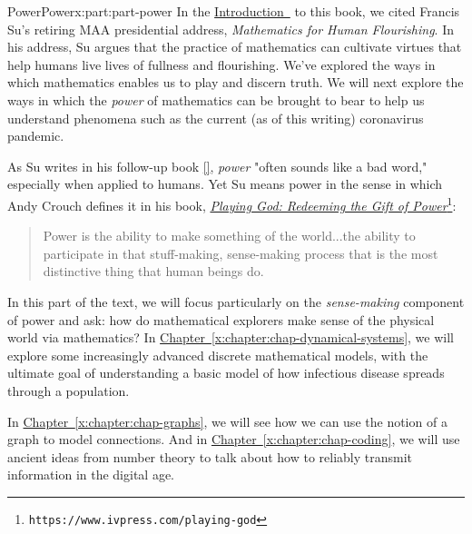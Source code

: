 \documentclass[oneside,10pt,]{book}
\newcommand{\xreffont}{\relax}
\numberwithin{equation}{section}
\begin{document}
%
%
\typeout{************************************************}
\typeout{************************************************}
%
\begin{partptx}{Power}{}{Power}{}{}{x:part:part-power}
 In the \hyperref[x:preface:Sec-Introduction]{Introduction~} to this book, we cited Francis Su's retiring MAA presidential address, \emph{Mathematics for Human Flourishing}. In his address, Su argues that the practice of mathematics can cultivate virtues that help humans live lives of fullness and flourishing. We've explored the ways in which mathematics enables us to play and discern truth. We will next explore the ways in which the \emph{power} of mathematics can be brought to bear to help us understand phenomena such as the current (as of this writing) coronavirus pandemic.%
\par
As Su writes in his follow-up book \hyperlink{x:biblio:Su2020}{[{\xreffont 1}]}, \emph{power} "often sounds like a bad word," especially when applied to humans. Yet Su means power in the sense in which Andy Crouch defines it in his book, \href{https://www.ivpress.com/playing-god}{\emph{Playing God: Redeeming the Gift of Power}}\footnote{\nolinkurl{https://www.ivpress.com/playing-god}\label{g:fn:idp105544742364816}}:%
\begin{quote}%
Power is the ability to make something of the world...the ability to participate in that stuff-making, sense-making process that is the most distinctive thing that human beings do.\end{quote}
In this part of the text, we will focus particularly on the \emph{sense-making} component of power and ask: how do mathematical explorers make sense of the physical world via mathematics? In \hyperref[x:chapter:chap-dynamical-systems]{Chapter~{\xreffont\ref{x:chapter:chap-dynamical-systems}}}, we will explore some increasingly advanced discrete mathematical models, with the ultimate goal of understanding a basic model of how infectious disease spreads through a population.%
\par
In \hyperref[x:chapter:chap-graphs]{Chapter~{\xreffont\ref{x:chapter:chap-graphs}}}, we will see how we can use the notion of a graph to model connections. And in \hyperref[x:chapter:chap-coding]{Chapter~{\xreffont\ref{x:chapter:chap-coding}}}, we will use ancient ideas from number theory to talk about how to reliably transmit information in the digital age.%
%
\typeout{************************************************}
\typeout{************************************************}

\end{partptx}
\end{document}
